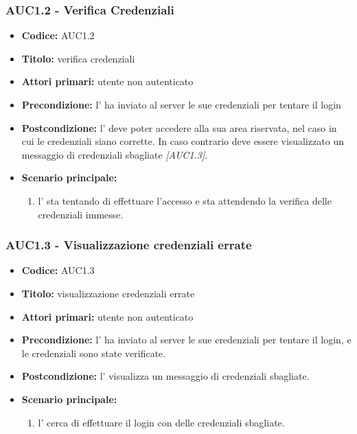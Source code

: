 \documentclass[casi-duso]{subfiles}
\begin{document}
\subsubsection{AUC1.2 - Verifica Credenziali}
\label{subsub:AUC1.2}
\begin{itemize}
  \item \textbf{Codice:} AUC1.2
  \item \textbf{Titolo:} verifica credenziali
  \item \textbf{Attori primari:} utente non autenticato
  \item \textbf{Precondizione:} l' ha inviato al server le sue credenziali per tentare il login
  \item \textbf{Postcondizione:} l' deve poter accedere alla sua area riservata, nel caso in cui le credenziali siano corrette. In caso
  contrario deve essere visualizzato un messaggio di credenziali sbagliate \emph{[AUC1.3]}.
  \item \textbf{Scenario principale:} 
  \begin{enumerate}
    \item l' sta tentando di effettuare l'accesso e sta attendendo la verifica delle credenziali immesse.
  \end{enumerate}
\end{itemize}

\subsubsection{AUC1.3 - Visualizzazione credenziali errate}
\label{subsub:AUC1.3}
\begin{itemize}
  \item \textbf{Codice:} AUC1.3
  \item \textbf{Titolo:} visualizzazione credenziali errate
  \item \textbf{Attori primari:} utente non autenticato
  \item \textbf{Precondizione:} l' ha inviato al server le sue credenziali per tentare il login, e le credenziali sono state verificate.
  \item \textbf{Postcondizione:} l' visualizza un messaggio di credenziali sbagliate.
  \item \textbf{Scenario principale:} 
  \begin{enumerate}
    \item l' cerca di effettuare il login con delle credenziali sbagliate. 
  \end{enumerate}
\end{itemize}
\end{document}
